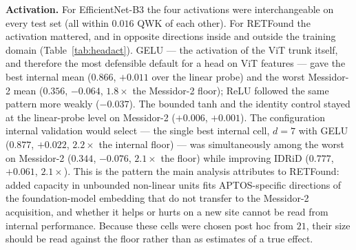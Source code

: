 \textbf{Activation.} For EfficientNet-B3 the four activations were
interchangeable on every test set (all within $0.016$ QWK of each other). For
RETFound the activation mattered, and in opposite directions inside and outside
the training domain (Table~\ref{tab:headact}). GELU --- the activation of the ViT
trunk itself, and therefore the most defensible default for a head on ViT
features --- gave the best internal mean ($0.866$, $+0.011$ over the linear probe)
and the worst Messidor-2 mean ($0.356$, $-0.064$, $1.8\times$ the Messidor-2
floor); ReLU followed the same pattern more weakly ($-0.037$). The bounded tanh
and the identity control stayed at the linear-probe level on Messidor-2
($+0.006$, $+0.001$). The configuration internal validation would select ---
the single best internal cell, $d=7$ with GELU ($0.877$, $+0.022$, $2.2\times$
the internal floor) --- was simultaneously among the worst on Messidor-2
($0.344$, $-0.076$, $2.1\times$ the floor) while improving IDRiD ($0.777$,
$+0.061$, $2.1\times$). This is the pattern the main analysis attributes to
RETFound: added capacity in unbounded non-linear units fits APTOS-specific
directions of the foundation-model embedding that do not transfer to the
Messidor-2 acquisition, and whether it helps or hurts on a new site cannot be
read from internal performance. Because these cells were chosen post hoc from
$21$, their size should be read against the floor rather than as estimates of a
true effect.


